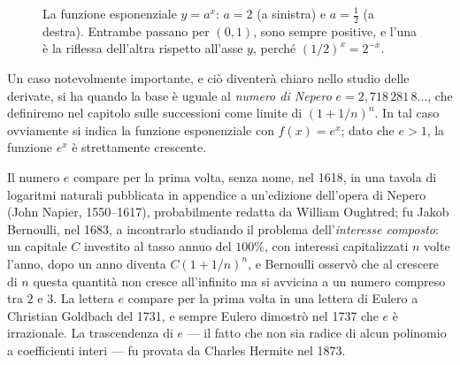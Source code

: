 \begin{figure}[htb]
\centering
{}\hfill
{}
\caption{La funzione esponenziale $y=a^{x}$: $a=2$ (a sinistra) e $a=\tfrac12$ (a
destra). Entrambe passano per $(0,1)$, sono sempre positive, e l'una è la riflessa
dell'altra rispetto all'asse $y$, perché $(1/2)^{x}=2^{-x}$.}
\label{fig:esponenziali}
\end{figure}

Un caso notevolmente importante, e ciò diventerà chiaro nello studio delle derivate, si
ha quando la base è uguale al \emph{numero di Nepero}
$e=2{,}718\,281\,8\dots$, che definiremo nel capitolo sulle successioni come limite di
$(1+1/n)^{n}$. In tal caso ovviamente si indica la funzione esponenziale con
$f(x)=e^{x}$; dato che $e>1$, la funzione $e^{x}$ è strettamente crescente.

\begin{notastorica}
Il numero $e$ compare per la prima volta, senza nome, nel 1618, in una tavola di
logaritmi naturali pubblicata in appendice a un'edizione dell'opera di Nepero (John
Napier, 1550--1617), probabilmente redatta da William Oughtred; fu Jakob Bernoulli, nel
1683, a incontrarlo studiando il
problema dell'\emph{interesse composto}: un capitale $C$ investito al tasso annuo del
$100\%$, con interessi capitalizzati $n$ volte l'anno, dopo un anno diventa
$C(1+1/n)^{n}$, e Bernoulli osservò che al crescere di $n$ questa quantità non cresce
all'infinito ma si avvicina a un numero compreso tra $2$ e $3$. La lettera $e$ compare
per la prima volta in una lettera di Eulero a Christian Goldbach del 1731, e sempre
Eulero dimostrò nel 1737 che $e$ è irrazionale. La trascendenza di $e$ --- il fatto che non sia radice di alcun
polinomio a coefficienti interi --- fu provata da Charles Hermite nel 1873.
\end{notastorica}

